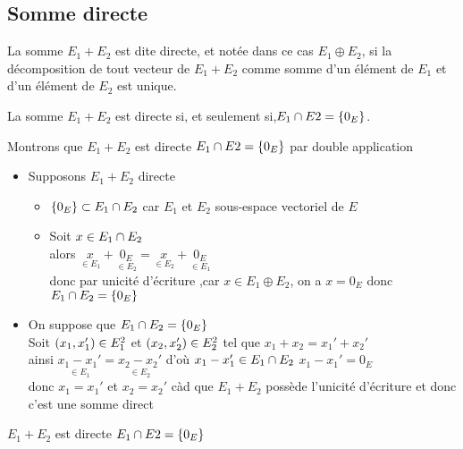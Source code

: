 \subsection{Somme directe}
\begin{defi}
    La somme \(E_1 + E_2\) est dite directe, et notée dans ce cas \(E_1 \oplus E_2\), si la décomposition de tout vecteur de \(E_1 + E_2\) comme somme d’un élément de \(E_1\) et d’un élément de \(E_2\) est unique.
\end{defi}
\begin{defprop}
    La somme \(E_1 + E_2\) est directe si, et seulement si,\( E_1 \cap E2 = \left\lbrace0_E \right\rbrace\).
\end{defprop}
\begin{dem}
    Montrons que \(E_1 + E_2\) est directe \ssi \( E_1 \cap E2 = \left\lbrace0_E \right\rbrace\) par double application
    \begin{itemize}
        \item \impdir Supposons \(E_1 + E_2\) directe\\
        \begin{itemize}
            \item \(\left\lbrace0_E\right\rbrace \subset E_1 \cap E_2\) car \(E_1\) et \(E_2\) sous-espace vectoriel de \(E\) \\
            \item Soit \(x \in E_1 \cap E_2\) \\
            alors \(\underset{\in E_1}{x} + \underset{\in E_2}{0_E} = \underset{\in E_2}{x} + \underset{\in E_1}{0_E}\)\\
            donc par unicité d'écriture ,car \(x \in E_1 \oplus E_2\), on a \(x = 0_E\) donc \(E_1 \cap E_2 = \left\lbrace0_E\right\rbrace\)
        \end{itemize}
        \item \imprec On suppose que \(E_1 \cap E_2 = \left\lbrace0_E\right\rbrace\) \\
        Soit \(\left(x_1,x_1'\right) \in E_1^2\) et \(\left(x_2, x_2'\right) \in E_2^2\) tel que \(x_1 + x_2 = x_1' + x_2'\)\\
        ainsi \(\underset{\in E_1}{x_1-x_1'} = \underset{\in E_2}{x_2 - x_2'}\) d'où \(x_1 - x_1' \in E_1 \cap E_2\) \ie \(x_1 - x_1' = 0_E\) \\
        donc \(x_1 = x_1'\) et \(x_2 = x_2'\) càd que \(E_1 + E_2\) possède l'unicité d'écriture et donc c'est une somme direct
    \end{itemize}
    \conclusion \(E_1 + E_2\) est directe \ssi \( E_1 \cap E2 = \left\lbrace0_E \right\rbrace\)
\end{dem}
